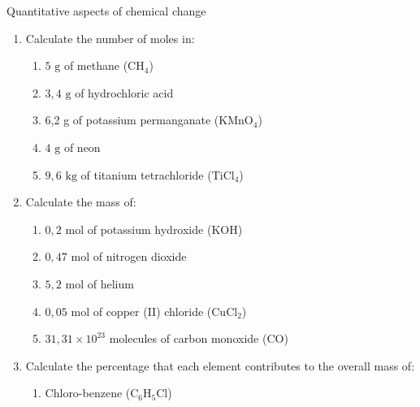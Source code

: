 \begin{eocexercises}{Quantitative aspects of chemical change}
\begin{enumerate}[noitemsep, label=\textbf{\arabic*}. ]
\begin{enumerate}[noitemsep, label=\textbf{\alph*}. ]
\begin{enumerate}[noitemsep, label=\textbf{\roman*}. ]
  \item $9,2$
  \item $4$
  \item $18,3$
  \end{enumerate}
 \item The concentration of a $150 {\text{ cm}}^{3}$ solution, containing $5 \text{ g}$ of $\text{NaCl}$ is:
  \begin{enumerate}[noitemsep, label=\textbf{\roman*}. ] 
  \item $0,09 \text{ mol} \cdot \text{dm}^{-3}$
  \item $5,7 \times 10^{-4} \text{ mol} \cdot \text{dm}^{-3}$
  \item $0,57 \text{ mol} \cdot \text{dm}^{-3}$
  \item $0,03 \text{ mol} \cdot \text{dm}^{-3}$
  \end{enumerate}
 \end{enumerate}
\item Calculate the number of moles in:
 \begin{enumerate}[noitemsep, label=\textbf{\alph*}. ] 
 \item $5 \text{ g}$ of methane (${\text{CH}}_{4}$)
 \item $3,4 \text{ g}$ of hydrochloric acid\item 6,2 g of potassium permanganate (${\text{KMnO}}_{4}$)
 \item $4 \text{ g}$ of neon
 \item $9,6 \text{ kg}$ of titanium tetrachloride (${\text{TiCl}}_{4}$)
 \end{enumerate}
\item Calculate the mass of:
 \begin{enumerate}[noitemsep, label=\textbf{\alph*}. ] 
 \item $0,2 \text{ mol}$ of potassium hydroxide ($\text{KOH}$)
 \item $0,47 \text{ mol}$ of nitrogen dioxide
 \item $5,2 \text{ mol}$ of helium
 \item $0,05 \text{ mol}$ of copper (II) chloride (${\text{CuCl}}_{2}$)
 \item $31,31 \times {10}^{23}$ molecules of carbon monoxide ($\text{CO}$)\end{enumerate}
\item Calculate the percentage that each element contributes to the overall mass of:
 \begin{enumerate}[noitemsep, label=\textbf{\alph*}. ] 
 \item Chloro-benzene (${\text{C}}_{6}{\text{H}}_{5}\text{Cl}$)

\end{enumerate}
\end{enumerate}
\end{eocexercises}
